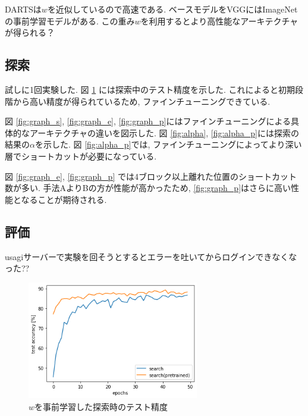 \documentclass[twocolumn]{jarticle}     %
\begin{document}
DARTSは$w$を近似しているので高速である.
ベースモデルをVGGにはImageNetの事前学習モデルがある.
この重み$w$を利用するとより高性能なアーキテクチャが得られる？

\subsection{探索}
試しに1回実験した.
図 \ref{fig:acc} には探索中のテスト精度を示した.
これによると初期段階から高い精度が得られているため, ファインチューニングできている.

図 \ref{fig:graph_s}, \ref{fig:graph_e}, \ref{fig:graph_p}にはファインチューニングによる具体的なアーキテクチャの違いを図示した.
図 \ref{fig:alpha}, \ref{fig:alpha_p}には探索の結果の$\alpha$を示した.
図 \ref{fig:alpha_p}では, ファインチューニングによってより深い層でショートカットが必要になっている.

図 \ref{fig:graph_e}, \ref{fig:graph_p} では4ブロック以上離れた位置のショートカット数が多い.
手法AよりBの方が性能が高かったため, \ref{fig:graph_p}はさらに高い性能となることが期待される.

\subsection{評価}
usagiサーバーで実験を回そうとするとエラーを吐いてからログインできなくなった??

\begin{figure}[tb]
 	\begin{center}
 		\includegraphics[clip,width=75mm]{acc.png}
 		\caption{$w$を事前学習した探索時のテスト精度}
 		\label{fig:acc}
 	\end{center}
\end{figure}
\end{document}
